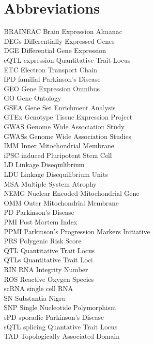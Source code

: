 \documentclass{article}
\begin{document}
\newpage
\tableofcontents
\listoftables
\listoffigures
\newpage
\section{Abbreviations}
BRAINEAC Brain Expression Almanac
\\DEGs Differentially Expressed Genes
\\DGE Differential Gene Expression
\\eQTL expression Quantitative Trait Locus
\\ETC Electron Transport Chain
\\fPD familial Parkinson's Disease
\\GEO Gene Expression Omnibus
\\GO Gene Ontology
\\GSEA Gene Set Enrichment Analysis
\\GTEx Genotype Tissue Expression Project
\\GWAS Genome Wide Association Study
\\GWASs Genome Wide Association Studies
\\IMM Inner Mitochondrial Membrane
\\iPSC induced Pluripotent Stem Cell
\\LD Linkage Disequilibrium
\\LDU Linkage Disequilibrium Units
\\MSA Multiple System Atrophy
\\NEMG Nuclear Encoded Mitochondrial Gene
\\OMM Outer Mitochondrial Membrane
\\PD Parkinson's Disease
\\PMI Post Mortem Index
\\PPMI Parkinson's Progression Markers Initiative
\\PRS Polygenic Risk Score
\\QTL Quantitative Trait Locus
\\QTLs Quantitative Trait Loci
\\RIN RNA Integrity Number
\\ROS Reactive Oxygen Species
\\scRNA single cell RNA
\\SN Substantia Nigra
\\SNP Single Nucleotide Polymorphism
\\sPD sporadic Parkinson's Disease
\\sQTL splicing Quantative Trait Locus
\\TAD Topologically Associated Domain
\newpage
\end{document}

